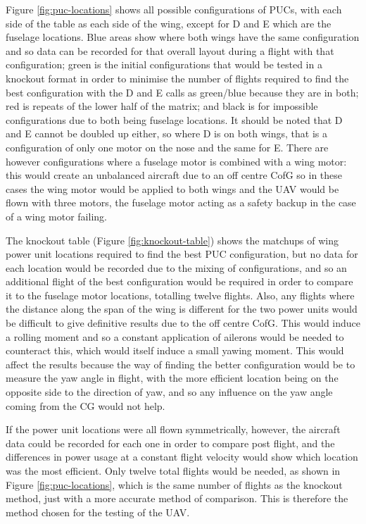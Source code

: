 \documentclass[../../main.tex]{subfiles}
\begin{document}
Figure \ref{fig:puc-locations} shows all possible configurations of PUCs, with each side of the table as each side of the wing, except for D and E which are the fuselage locations.
Blue areas show where both wings have the same configuration and so data can be recorded for that overall layout during a flight with that configuration; green is the initial configurations that would be tested in a knockout format in order to minimise the number of flights required to find the best configuration with the D and E calls as green/blue because they are in both; red is repeats of the lower half of the matrix; and black is for impossible configurations due to both being fuselage locations.
It should be noted that D and E cannot be doubled up either, so where D is on both wings, that is a configuration of only one motor on the nose and the same for E.
There are however configurations where a fuselage motor is combined with a wing motor: this would create an unbalanced aircraft due to an off centre CofG so in these cases the wing motor would be applied to both wings and the UAV would be flown with three motors, the fuselage motor acting as a safety backup in the case of a wing motor failing.


The knockout table (Figure \ref{fig:knockout-table}) shows the matchups of wing power unit locations required to find the best PUC configuration, but no data for each location would be recorded due to the mixing of configurations, and so an additional flight of the best configuration would be required in order to compare it to the fuselage motor locations, totalling twelve flights.
Also, any flights where the distance along the span of the wing is different for the two power units would be difficult to give definitive results due to the off centre CofG.
This would induce a rolling moment and so a constant application of ailerons would be needed to counteract this, which would itself induce a small yawing moment.
This would affect the results because the way of finding the better configuration would be to measure the yaw angle in flight, with the more efficient location being on the opposite side to the direction of yaw, and so any influence on the yaw angle coming from the CG would not help. 

If the power unit locations were all flown symmetrically, however, the aircraft data could be recorded for each one in order to compare post flight, and the differences in power usage at a constant flight velocity would show which location was the most efficient.
Only twelve total flights would be needed, as shown in Figure \ref{fig:puc-locations}, which is the same number of flights as the knockout method, just with a more accurate method of comparison.
This is therefore the method chosen for the testing of the UAV.
\end{document}
